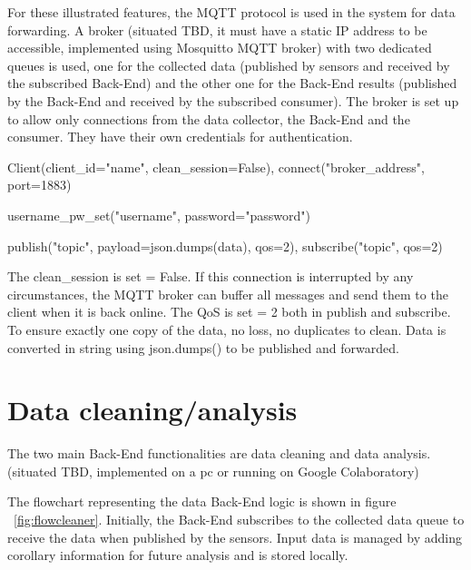 For these illustrated features, the MQTT protocol is used in the system for data forwarding. A broker (situated TBD, it must have a static IP address to be accessible, implemented using Mosquitto MQTT broker) with two dedicated queues is used, one for the collected data (published by sensors and received by the subscribed Back-End) and the other one for the Back-End results (published by the Back-End and received by the subscribed consumer).
The broker is set up to allow only connections from the data collector, the Back-End and the consumer. They have their own credentials for authentication.

Client(client\_id="name", clean\_session=False), connect("broker\_address", port=1883)

username\_pw\_set("username", password="password")

publish("topic", payload=json.dumps(data), qos=2), subscribe("topic", qos=2)

The clean\_session is set = False. If this connection is interrupted by any circumstances, the MQTT broker can buffer all messages and send them to the client when it is back online. The QoS is set = 2 both in publish and subscribe. To ensure exactly one copy of the data, no loss, no duplicates to clean. Data is converted in string using json.dumps() to be published and forwarded.


\section{Data cleaning/analysis}
\label{sec:analysis}
\vspace{0.2 cm} 

The two main Back-End functionalities are data cleaning and data analysis.(situated TBD, implemented on a pc or running on Google Colaboratory)

The flowchart representing the data Back-End logic is shown in figure ~\ref{fig:flowcleaner}. Initially, the Back-End subscribes to the collected data queue to receive the data when published by the sensors. Input data is managed by adding corollary information for future analysis and is stored locally.

